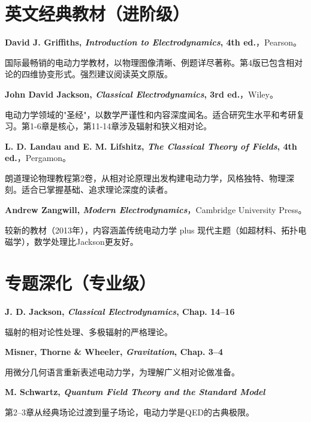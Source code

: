 \documentclass[11pt,a4paper,openany,oneside]{book}
\begin{document}
\section*{英文经典教材（进阶级）}
\begin{enumerate}[label={[\arabic*]},resume]
\item \textbf{David J. Griffiths, \textit{Introduction to Electrodynamics}, 4th ed.}，Pearson。\par
  国际最畅销的电动力学教材，以物理图像清晰、例题详尽著称。第4版已包含相对论的四维协变形式。强烈建议阅读英文原版。

\item \textbf{John David Jackson, \textit{Classical Electrodynamics}, 3rd ed.}，Wiley。\par
  电动力学领域的"圣经"，以数学严谨性和内容深度闻名。适合研究生水平和考研复习。第1-6章是核心，第11-14章涉及辐射和狭义相对论。

\item \textbf{L. D. Landau and E. M. Lifshitz, \textit{The Classical Theory of Fields}, 4th ed.}，Pergamon。\par
  朗道理论物理教程第2卷，从相对论原理出发构建电动力学，风格独特、物理深刻。适合已掌握基础、追求理论深度的读者。

\item \textbf{Andrew Zangwill, \textit{Modern Electrodynamics}}，Cambridge University Press。\par
  较新的教材（2013年），内容涵盖传统电动力学 plus 现代主题（如超材料、拓扑电磁学），数学处理比Jackson更友好。
\end{enumerate}

\section*{专题深化（专业级）}
\begin{enumerate}[label={[\arabic*]},resume]
\item \textbf{J. D. Jackson, \textit{Classical Electrodynamics}, Chap. 14--16}\par
  辐射的相对论性处理、多极辐射的严格理论。

\item \textbf{Misner, Thorne \& Wheeler, \textit{Gravitation}, Chap. 3--4}\par
  用微分几何语言重新表述电动力学，为理解广义相对论做准备。

\item \textbf{M. Schwartz, \textit{Quantum Field Theory and the Standard Model}}\par
  第2--3章从经典场论过渡到量子场论，电动力学是QED的古典极限。
\end{enumerate}
\end{document}
